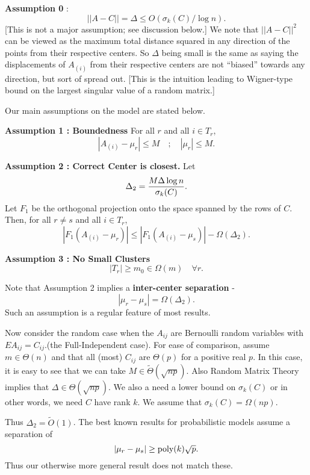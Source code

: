 \documentclass{book}
\numberwithin{exercise}{chapter}
\begin{document}
{\bf Assumption 0} : $$||A-C||=\Delta\leq O(\sigma_k(C)/\log n).$$
[This is not a major assumption; see discussion below.]
We note that $||A-C||^2$ can be
viewed as the maximum total distance squared in any direction
of the points from their respective centers. So $\Delta$ being small
is the same as saying the displacements of $A_{(i)}$ from their respective
centers are not ``biased'' towards any direction, but sort of spread out.
[This is the intuition leading to Wigner-type bound on the largest singular
value of a random matrix.]

Our main assumptions on the model are stated below.

{\bf Assumption 1 : Boundedness} For all $r$ and all $i\in T_r$,
$$|A_{(i)}-\mu_r|\leq M\quad ;\quad |\mu_r|\leq M.$$

{\bf Assumption 2 : Correct Center is closest.}
Let $$\Delta_2={M\Delta \log n\over \sigma_k(C)}.$$
Let $F_1$ be the orthogonal projection onto the space spanned by the rows of $C$. Then,
for all $r\not= s$ and all $i\in T_r$,
$$|F_1(A_{(i)}-\mu _r)|\leq |F_1(A_{(i)}-\mu_s)| - \Omega (\Delta_2).$$

{\bf Assumption 3 : No Small Clusters} $$|T_r|\geq m_0 \in \Omega (m)\quad \forall r.$$

Note that Assumption 2 implies a {\bf inter-center separation} -
$$|\mu_r-\mu_s| = \Omega (\Delta_2).$$
Such an assumption is a regular feature
of most results.

Now consider the random case when the $A_{ij}$ are Bernoulli random
variables with $EA_{ij}=C_{ij}$.(the Full-Independent
case). For ease of comparison, assume $m\in \Theta(n)$ and that
all (most) $C_{ij}$ are $\Theta(p)$ for a positive real $p$.
In this case, it is easy to see that we can take $M\in \tilde \Theta(\sqrt {np})$.
Also Random Matrix Theory implies that $\Delta \in \Theta (\sqrt {np})$.
We also a need a lower bound on $\sigma_k(C)$ or in other words, we need
$C$ have rank $k$. We assume that  $\sigma_k(C) = \Omega(np)$.

Thus $\Delta_2 = \tilde O(1)$. The best known results for probabilistic models
assume a separation of
$$|\mu_r-\mu_s|\geq \hbox{poly}(k)\sqrt p.$$
Thus our otherwise more general result does not match these.
\end{document}
